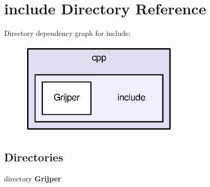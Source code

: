 \section{include Directory Reference}
\label{dir_608f2e8c297dcd7d319aee4888f86333}
Directory dependency graph for include\-:\nopagebreak
\begin{figure}[H]
\begin{center}
\leavevmode
\includegraphics[width=218pt]{dir_608f2e8c297dcd7d319aee4888f86333_dep}
\end{center}
\end{figure}
\subsection*{Directories}
\begin{DoxyCompactItemize}
\item 
directory {\bf Grijper}
\end{DoxyCompactItemize}
